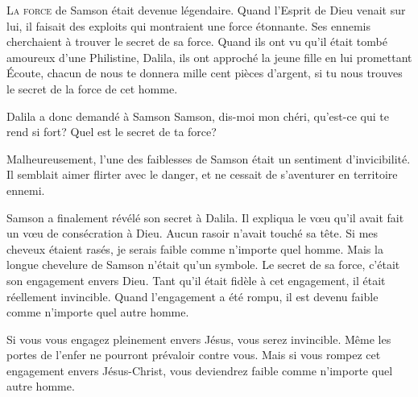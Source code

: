 


\lettrine{L}{a force} de Samson était devenue légendaire.
 Quand l'Esprit de Dieu venait sur lui, il faisait des exploits
 qui montraient une force étonnante.
 Ses ennemis cherchaient à trouver le secret de sa force.
 Quand ils ont vu qu'il était tombé amoureux d'une Philistine, Dalila,
 ils ont approché la jeune fille en lui promettant\frcolon{}
 \Og Écoute, chacun de nous te donnera mille cent pièces d'argent,
 si tu nous trouves le secret de la force de cet homme. \Fg{}

Dalila a donc demandé à Samson\frcolon{}
 \Og Samson, dis-moi mon chéri, qu'est-ce qui te rend si fort?
 Quel est le secret de ta force? \Fg{}

Malheureusement, l'une des faiblesses de Samson était
 un sentiment d'invicibilité.
 Il semblait aimer flirter avec le danger,
 et ne cessait de s'aventurer en territoire ennemi.

Samson a finalement révélé son secret à Dalila.
 Il expliqua le v\oe{}u qu'il avait fait
 \ocadr un v\oe{}u de consécration à Dieu.
 Aucun rasoir n'avait touché sa tête.
 \Og Si mes cheveux étaient rasés,
 je serais faible comme n'importe quel homme. \Fg{}
 Mais la longue chevelure de Samson n'était qu'un symbole.
 Le secret de sa force, c'était son engagement envers Dieu.
 Tant qu'il était fidèle à cet engagement, il était réellement invincible.
 Quand l'engagement a été rompu, il est devenu faible
 comme n'importe quel autre homme.


Si vous vous engagez pleinement envers Jésus, vous serez invincible.
 Même les portes de l'enfer ne pourront prévaloir contre vous.
 Mais si vous rompez cet engagement envers Jésus-Christ,
 vous deviendrez faible comme n'importe quel autre homme. 

\dvrule




